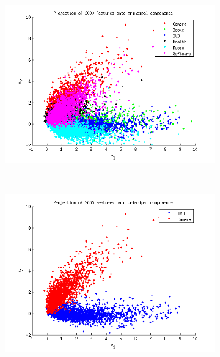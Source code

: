 \begin{figure}[h!btcp]
        \centering
       \begin{subfigure}[b]{0.5\linewidth}
                \centering
                \includegraphics[width=\textwidth]{../Plottar/pca_all.png}
               \caption{}
        \end{subfigure}%
        ~ %
        \begin{subfigure}[b]{0.5\linewidth}
                \centering
                \includegraphics[width=\linewidth]{../Plottar/pca_nocorr.png} 
                               \caption{}
        \end{subfigure}

\end{figure}
